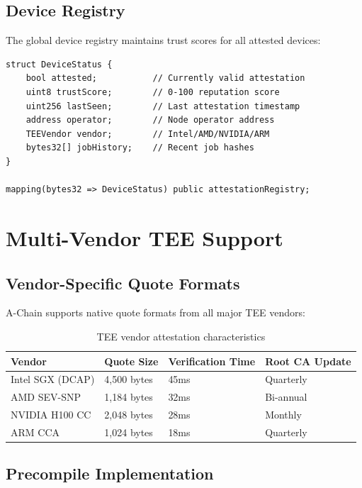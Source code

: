 \documentclass[11pt,a4paper]{article}
\begin{document}
\subsection{Device Registry}

The global device registry maintains trust scores for all attested devices:

\begin{lstlisting}[language=Solidity, basicstyle=\small\ttfamily]
struct DeviceStatus {
    bool attested;           // Currently valid attestation
    uint8 trustScore;        // 0-100 reputation score
    uint256 lastSeen;        // Last attestation timestamp
    address operator;        // Node operator address
    TEEVendor vendor;        // Intel/AMD/NVIDIA/ARM
    bytes32[] jobHistory;    // Recent job hashes
}

mapping(bytes32 => DeviceStatus) public attestationRegistry;
\end{lstlisting}

\section{Multi-Vendor TEE Support}

\subsection{Vendor-Specific Quote Formats}

A-Chain supports native quote formats from all major TEE vendors:

\begin{table}[h]
\centering
\begin{tabular}{@{}llll@{}}
\toprule
\textbf{Vendor} & \textbf{Quote Size} & \textbf{Verification Time} & \textbf{Root CA Update} \\ \midrule
Intel SGX (DCAP) & 4,500 bytes & 45ms & Quarterly \\
AMD SEV-SNP & 1,184 bytes & 32ms & Bi-annual \\
NVIDIA H100 CC & 2,048 bytes & 28ms & Monthly \\
ARM CCA & 1,024 bytes & 18ms & Quarterly \\ \bottomrule
\end{tabular}
\caption{TEE vendor attestation characteristics}
\end{table}

\subsection{Precompile Implementation}
\end{document}
